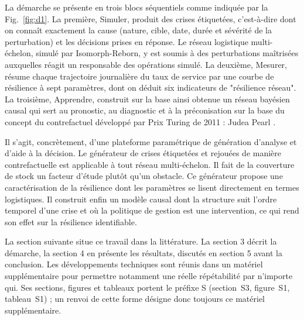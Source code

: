 La démarche se présente en trois blocs séquentiels comme indiquée par la Fig.~\ref{fig:d1}. La première, Simuler, produit des crises étiquetées, c'est-à-dire dont on connaît exactement la cause (nature, cible, date, durée et sévérité de la perturbation) et les décisions prises en réponse. Le réseau logistique multi-échelon, simulé par Isomorph-Reborn, y est soumis à des perturbations maîtrisées auxquelles réagit un responsable des opérations simulé. La deuxième, Mesurer, résume chaque trajectoire journalière du taux de service par une courbe de résilience à sept paramètres, dont on déduit six indicateurs de "résilience réseau". La troisième, Apprendre, construit sur la base ainsi obtenue un réseau bayésien causal qui sert au pronostic, au diagnostic et à la préconisation sur la base du concept du contrefactuel développé par Prix Turing de 2011 : Judea Pearl \citep{pearl2009}.

\begin{center}
\resizebox{0.88\textwidth}{!}{}
\label{fig:d1}
\end{center}

Il s'agit, concrètement, d'une plateforme paramétrique de génération d'analyse et d'aide à la décision. Le générateur de crises étiquetées et rejouées de manière contrefactuelle est applicable à tout réseau multi-échelon. Il fait de la couverture de stock un facteur d'étude plutôt qu'un obstacle. Ce générateur propose une caractérisation de la résilience dont les paramètres se lisent directement en termes logistiques. Il construit enfin un modèle causal dont la structure suit l'ordre temporel d'une crise et où la politique de gestion est une intervention, ce qui rend son effet sur la résilience identifiable.

La section suivante situe ce travail dans la littérature. La section 3 décrit la démarche, la section 4 en présente les résultats, discutés en section 5 avant la conclusion. Les développements techniques sont réunis dans un matériel supplémentaire pour permettre notamment une réelle répétabilité par n'importe qui. Ses sections, figures et tableaux portent le préfixe S (section~S3, figure~S1, tableau~S1) ; un renvoi de cette forme désigne donc toujours ce matériel supplémentaire.
